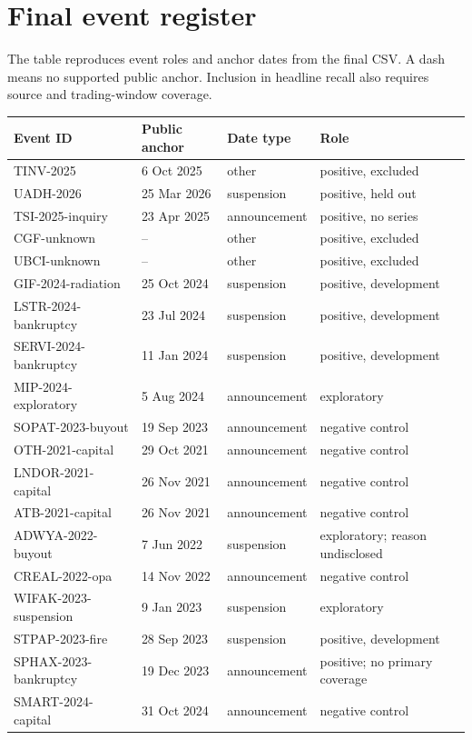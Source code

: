 \clearpage
\section{Final event register}
The table reproduces event roles and anchor dates from the final CSV.
A dash means no supported public anchor. Inclusion in headline recall
also requires source and trading-window coverage.
\par\small\noindent
\begin{tabular}{@{}p{43mm}p{23mm}p{32mm}p{44mm}@{}}
\toprule Event ID & Public anchor & Date type & Role\\\midrule
TINV-2025 & 6 Oct 2025 & other & positive, excluded\\
UADH-2026 & 25 Mar 2026 & suspension & positive, held out\\
TSI-2025-inquiry & 23 Apr 2025 & announcement & positive, no series\\
CGF-unknown & -- & other & positive, excluded\\
UBCI-unknown & -- & other & positive, excluded\\
GIF-2024-radiation & 25 Oct 2024 & suspension & positive, development\\
LSTR-2024-bankruptcy & 23 Jul 2024 & suspension & positive, development\\
SERVI-2024-bankruptcy & 11 Jan 2024 & suspension & positive, development\\
MIP-2024-exploratory & 5 Aug 2024 & announcement & exploratory\\
SOPAT-2023-buyout & 19 Sep 2023 & announcement & negative control\\
OTH-2021-capital & 29 Oct 2021 & announcement & negative control\\
LNDOR-2021-capital & 26 Nov 2021 & announcement & negative control\\
ATB-2021-capital & 26 Nov 2021 & announcement & negative control\\
ADWYA-2022-buyout & 7 Jun 2022 & suspension & exploratory; reason undisclosed\\
CREAL-2022-opa & 14 Nov 2022 & announcement & negative control\\
WIFAK-2023-suspension & 9 Jan 2023 & suspension & exploratory\\
STPAP-2023-fire & 28 Sep 2023 & suspension & positive, development\\
SPHAX-2023-bankruptcy & 19 Dec 2023 & announcement & positive; no primary coverage\\
SMART-2024-capital & 31 Oct 2024 & announcement & negative control\\

\end{tabular}
